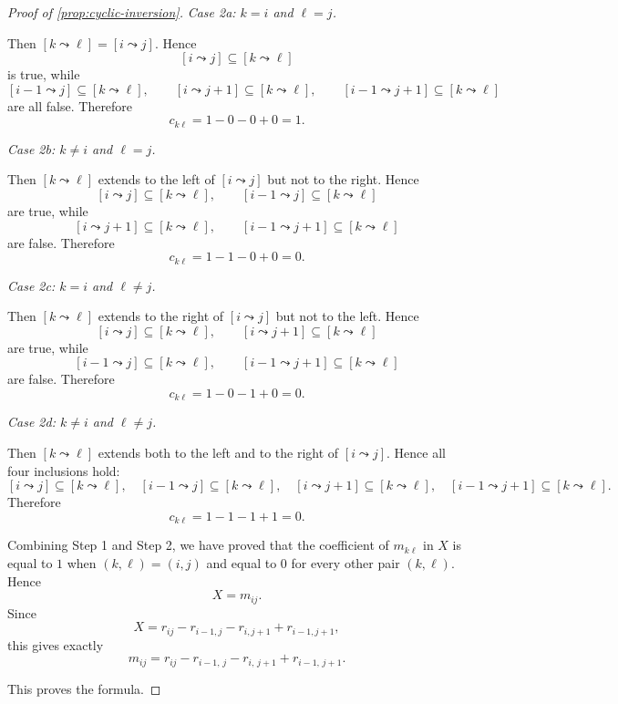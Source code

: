 \documentclass{article}
\theoremstyle{definition}
\begin{document}
\begin{proof}[Proof of \ref{prop:cyclic-inversion}]
\medskip
\noindent
\emph{Case 2a: $k=i$ and $\ell=j$.}

Then $[k\leadsto \ell]=[i\leadsto j]$. Hence
\[
[i\leadsto j]\subseteq [k\leadsto \ell]
\]
is true, while
\[
[i-1\leadsto j]\subseteq [k\leadsto \ell],\qquad
[i\leadsto j+1]\subseteq [k\leadsto \ell],\qquad
[i-1\leadsto j+1]\subseteq [k\leadsto \ell]
\]
are all false. Therefore
\[
c_{k\ell}=1-0-0+0=1.
\]

\medskip
\noindent
\emph{Case 2b: $k\neq i$ and $\ell=j$.}

Then $[k\leadsto \ell]$ extends to the left of $[i\leadsto j]$ but not to the
right. Hence
\[
[i\leadsto j]\subseteq [k\leadsto \ell],\qquad
[i-1\leadsto j]\subseteq [k\leadsto \ell]
\]
are true, while
\[
[i\leadsto j+1]\subseteq [k\leadsto \ell],\qquad
[i-1\leadsto j+1]\subseteq [k\leadsto \ell]
\]
are false. Therefore
\[
c_{k\ell}=1-1-0+0=0.
\]

\medskip
\noindent
\emph{Case 2c: $k=i$ and $\ell\neq j$.}

Then $[k\leadsto \ell]$ extends to the right of $[i\leadsto j]$ but not to the
left. Hence
\[
[i\leadsto j]\subseteq [k\leadsto \ell],\qquad
[i\leadsto j+1]\subseteq [k\leadsto \ell]
\]
are true, while
\[
[i-1\leadsto j]\subseteq [k\leadsto \ell],\qquad
[i-1\leadsto j+1]\subseteq [k\leadsto \ell]
\]
are false. Therefore
\[
c_{k\ell}=1-0-1+0=0.
\]

\medskip
\noindent
\emph{Case 2d: $k\neq i$ and $\ell\neq j$.}

Then $[k\leadsto \ell]$ extends both to the left and to the right of
$[i\leadsto j]$. Hence all four inclusions hold:
\[
[i\leadsto j]\subseteq [k\leadsto \ell],\quad
[i-1\leadsto j]\subseteq [k\leadsto \ell],\quad
[i\leadsto j+1]\subseteq [k\leadsto \ell],\quad
[i-1\leadsto j+1]\subseteq [k\leadsto \ell].
\]
Therefore
\[
c_{k\ell}=1-1-1+1=0.
\]

\medskip
Combining Step 1 and Step 2, we have proved that the coefficient of
$m_{k\ell}$ in $X$ is equal to $1$ when $(k,\ell)=(i,j)$ and equal to $0$
for every other pair $(k,\ell)$. Hence
\[
X=m_{ij}.
\]
Since
\[
X=r_{ij}-r_{i-1,j}-r_{i,j+1}+r_{i-1,j+1},
\]
this gives exactly
\[
m_{ij}
=
r_{ij}
-
r_{i-1,\,j}
-
r_{i,\,j+1}
+
r_{i-1,\,j+1}.
\]

This proves the formula.
\end{proof}
\end{document}
